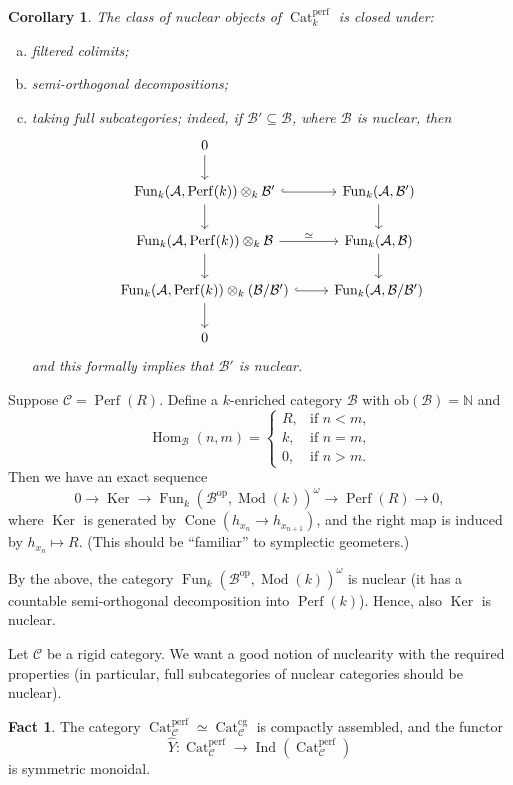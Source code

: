 \documentclass[draft]{amsart}
\newcommand{\NN}{\mathbb{N}}
\newcommand{\wh}[1]{\widehat{#1}}
\newcommand{\cat}[1]{\mathcal{#1}}
\newcommand{\op}{\mathrm{op}}
\DeclareMathOperator{\Hom}{Hom}
\DeclareMathOperator{\Ind}{Ind}
\DeclareMathOperator{\Cat}{Cat}
\DeclareMathOperator{\Fun}{Fun}
\DeclareMathOperator{\Mod}{Mod}
\DeclareMathOperator{\Perf}{Perf}
\DeclareMathOperator{\Ker}{Ker}
\DeclareMathOperator{\Cone}{Cone}
\newtheorem{cor}[thm]{Corollary}
\theoremstyle{definition}
\newtheorem{fact}[thm]{Fact}
\begin{document}
\begin{cor}
The class of nuclear objects of $\Cat_k^{\mathrm{perf}}$ is closed under:
\begin{enumerate}[(a)]
\item filtered colimits;
\item semi-orthogonal decompositions;
\item taking full subcategories; indeed, if $\cat B'\subseteq \cat B$, where $\cat B$ is nuclear, then
\[
\begin{tikzcd}
0 \ar[d] & \\
\Fun_k(\cat A, \Perf(k))\otimes_k \cat B' \ar[r,hook] \ar[d] & \Fun_k(\cat A, \cat B') \ar[d] \\
\Fun_k(\cat A, \Perf(k))\otimes_k \cat B \ar[r,"\simeq"] \ar[d] & \Fun_k(\cat A, \cat B) \ar[d] \\
\Fun_k(\cat A, \Perf(k))\otimes_k (\cat B/\cat B') \ar[d] \ar[r,hook] & \Fun_k(\cat A, \cat B/\cat B') \\
0
\end{tikzcd}
\]
and this formally implies that $\cat B'$ is nuclear.
\end{enumerate}
\end{cor}

Suppose $\cat C = \Perf(R)$. Define a $k$-enriched category $\cat B$ with $\mathrm{ob}(\cat B) = \NN$ and
\[
\Hom_{\cat B}(n,m) = \begin{cases}
R, & \text{if $n<m$,} \\
k, & \text{if $n=m$,} \\
0, & \text{if $n>m$.}
\end{cases}
\]
Then we have an exact sequence
\[
0\to \Ker \to \Fun_k(\cat B^\op, \Mod(k))^{\omega} \to \Perf(R) \to 0,
\]
where $\Ker$ is generated by $\Cone(h_{x_n} \to h_{x_{n+1}})$, and the right map is induced by $h_{x_n} \mapsto R$. (This should be \enquote{familiar} to symplectic geometers.)

By the above, the category $\Fun_k(\cat B^\op, \Mod(k))^\omega$ is nuclear (it has a countable semi-orthogonal decomposition into $\Perf(k)$). Hence, also $\Ker$ is nuclear.
\bigskip

Let $\cat C$ be a rigid category. We want a good notion of nuclearity with the required properties (in particular, full subcategories of nuclear categories should be nuclear).

\begin{fact}
The category $\Cat^{\mathrm{perf}}_{\cat C} \simeq \Cat^{\mathrm{cg}}_{\cat C}$ is compactly assembled, and the functor
\[
\wh{Y} \colon \Cat_{\cat C}^{\mathrm{perf}} \to \Ind(\Cat^{\mathrm{perf}}_{\cat C})
\]
is symmetric monoidal.
\end{fact}
\end{document}
